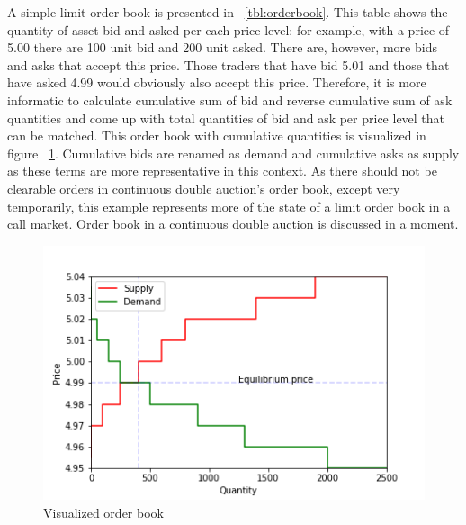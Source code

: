 A simple limit order book is presented in ~\ref{tbl:orderbook}. This table shows the
quantity of asset bid and asked per each price level: for example, with a price of 5.00
there are 100 unit bid and 200 unit asked. There are, however, more bids and asks that 
accept this price. Those traders that have bid 5.01 and those that have asked 4.99 would obviously also accept
this price. Therefore, it is more informatic to calculate cumulative sum of bid and reverse cumulative sum of 
ask quantities and come up with total quantities of bid and ask per price level that can be matched.  
This order book with cumulative quantities is visualized in figure ~\ref{fig:lob_visual}. Cumulative bids
are renamed as demand and cumulative asks as supply as these terms are more representative in this context.
As there should not be clearable orders in continuous double auction's order book, except very temporarily, 
this example represents more of the state of a limit order book in a call market. Order book
in a continuous double auction is discussed in a moment.

\begin{figure}
    \begin{center}  
        \includegraphics{plots/orderbook_visualized.png}
        \caption{Visualized order book}
        \label{fig:lob_visual}
    \end{center}
\end{figure}

